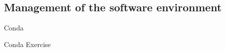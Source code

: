 \documentclass{beamer}
\begin{document}
\frame{\titlepage}

\subsection{Management of the software environment}

\begin{frame}{}
    \huge{Conda}
\end{frame}


\begin{frame}{}
    \huge{Conda Exercise}
\end{frame}


\end{document}

